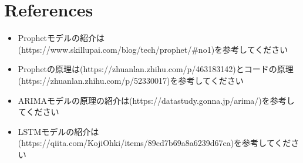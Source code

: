 \documentclass{beamer}  %
\begin{document}
\section{References}
\begin{frame}
    \begin{itemize}
        \item Prophetモデルの紹介は(https://www.skillupai.com/blog/tech/prophet/#no1)を参考してください
        \item Prophetの原理は(https://zhuanlan.zhihu.com/p/463183142)とコードの原理(https://zhuanlan.zhihu.com/p/52330017)を参考してください
        \item ARIMAモデルの原理の紹介は(https://datastudy.gonna.jp/arima/)を参考してください
        \item LSTMモデルの紹介は(https://qiita.com/KojiOhki/items/89cd7b69a8a6239d67ca)を参考してください
    \end{itemize}
\end{frame}



\end{document}
